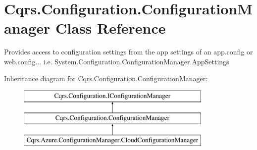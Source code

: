 \hypertarget{classCqrs_1_1Configuration_1_1ConfigurationManager}{}\section{Cqrs.\+Configuration.\+Configuration\+Manager Class Reference}
\label{classCqrs_1_1Configuration_1_1ConfigurationManager}


Provides access to configuration settings from the app settings of an app.\+config or web.\+config... i.\+e. System.\+Configuration.\+Configuration\+Manager.\+App\+Settings  


Inheritance diagram for Cqrs.\+Configuration.\+Configuration\+Manager\+:\begin{figure}[H]
\begin{center}
\leavevmode
\includegraphics[height=3.000000cm]{classCqrs_1_1Configuration_1_1ConfigurationManager}
\end{center}
\end{figure}
